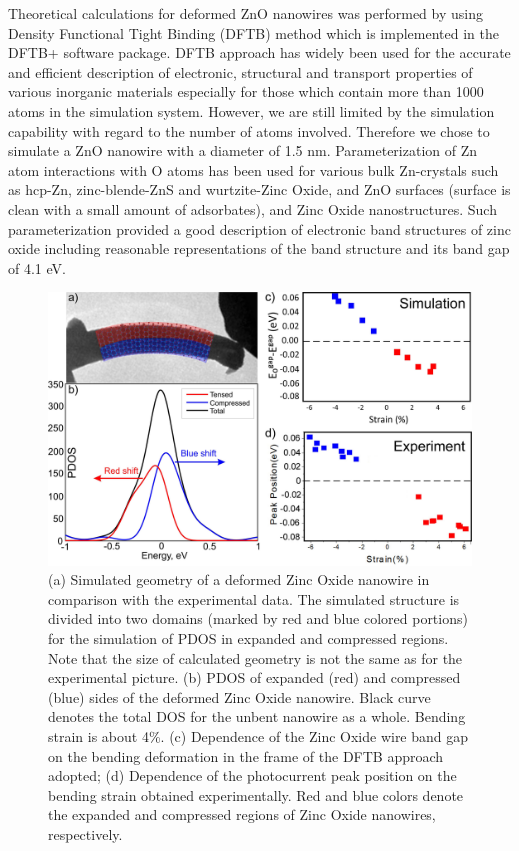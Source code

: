 Theoretical calculations for deformed ZnO nanowires was performed by using Density Functional Tight Binding (DFTB) method which is implemented in the DFTB+ software package.\cite{T.2007} 
DFTB approach has widely been used for the accurate and efficient description of electronic, structural and transport properties of various inorganic materials especially for those which contain more than 1000 atoms in the simulation system. 
However, we are still limited by the simulation capability with regard to the number of atoms involved. 
Therefore we chose to simulate a ZnO nanowire with a diameter of 1.5 nm. 
Parameterization of Zn atom interactions with O atoms has been used for various bulk Zn-crystals such as hcp-Zn, zinc-blende-ZnS and wurtzite-Zinc Oxide, and ZnO surfaces (surface is clean with a small amount of adsorbates), and Zinc Oxide nanostructures. 
Such parameterization provided a good description of electronic band structures of zinc oxide including reasonable representations of the band structure and its band gap of 4.1 eV.\cite{T.2009}

\begin{figure}  
\includegraphics[width=\textwidth]{figures/figure5_3}
\caption[DFTB calculation match experimental result]{(a) Simulated geometry of a deformed Zinc Oxide nanowire in comparison with the experimental data. The simulated structure is divided into two domains (marked by red and blue colored portions) for the simulation of PDOS in expanded and compressed regions. Note that the size of calculated geometry is not the same as for the experimental picture. (b) PDOS of expanded (red) and compressed (blue) sides of the deformed Zinc Oxide nanowire. Black curve denotes the total DOS for the unbent nanowire as a whole. Bending strain is about 4\%. (c) Dependence of the Zinc Oxide wire band gap on the bending deformation in the frame of the DFTB approach adopted; (d) Dependence of the photocurrent peak position on the bending strain obtained experimentally. Red and blue colors denote the expanded and compressed regions of Zinc Oxide nanowires, respectively. 
\label{fig:5_3}}
\end{figure}


